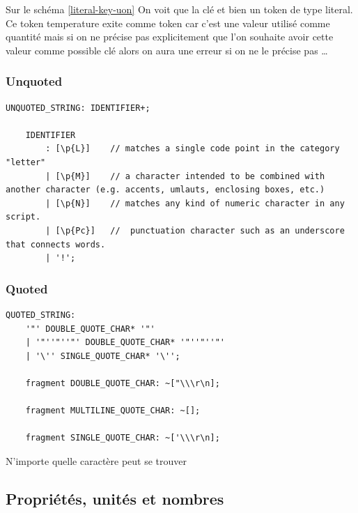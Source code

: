 \documentclass[
    iict, %
    il, %
]{heig-tb}
\begin{document}
Sur le schéma \ref*{literal-key-uon} On voit que la clé et bien un token de type literal.
Ce token temperature exite comme token car c'est une valeur utilisé comme quantité mais si on ne précise pas explicitement que l'on souhaite avoir cette valeur
comme possible  clé alors on aura une erreur si on ne le précise pas \dots %

\subsubsection{Unquoted}

\begin{lstlisting}[frame=single,caption={unquoted},label={unquoted}]
    UNQUOTED_STRING: IDENTIFIER+;

    IDENTIFIER
        : [\p{L}]    // matches a single code point in the category "letter"
        | [\p{M}]    // a character intended to be combined with another character (e.g. accents, umlauts, enclosing boxes, etc.)
        | [\p{N}]    // matches any kind of numeric character in any script.
        | [\p{Pc}]   //  punctuation character such as an underscore that connects words.
        | '!';
\end{lstlisting}


\subsubsection{Quoted}

\begin{lstlisting}[frame=single,caption={quoted},label={quoted}]
    QUOTED_STRING:
    '"' DOUBLE_QUOTE_CHAR* '"'
    | '"''"''"' DOUBLE_QUOTE_CHAR* '"''"''"'
    | '\'' SINGLE_QUOTE_CHAR* '\'';

    fragment DOUBLE_QUOTE_CHAR: ~["\\\r\n];

    fragment MULTILINE_QUOTE_CHAR: ~[];

    fragment SINGLE_QUOTE_CHAR: ~['\\\r\n];
\end{lstlisting}

N'importe quelle caractère peut se trouver


\subsection{Propriétés, unités et nombres}
\end{document}
